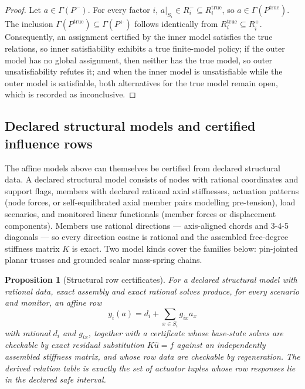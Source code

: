 \documentclass[11pt]{article}
\theoremstyle{plain}
\newtheorem{proposition}[theorem]{Proposition}
\theoremstyle{definition}
\theoremstyle{remark}
\begin{document}
\begin{proof}
Let \(a\in\Gamma(P^-)\).  For every factor \(i\),
\(a|_{S_i}\in R_i^-\subseteq R_i^{\mathrm{true}}\), so
\(a\in\Gamma(P^{\mathrm{true}})\).  The inclusion
\(\Gamma(P^{\mathrm{true}})\subseteq\Gamma(P^+)\) follows identically from
\(R_i^{\mathrm{true}}\subseteq R_i^+\).  Consequently, an assignment certified
by the inner model satisfies the true relations, so inner satisfiability
exhibits a true finite-model policy; if the outer model has no global
assignment, then neither has the true model, so outer unsatisfiability refutes
it; and when the inner model is unsatisfiable while the outer model is
satisfiable, both alternatives for the true model remain open, which is
recorded as inconclusive.
\end{proof}

\subsection{Declared structural models and certified influence rows}
\label{subsec:structural-front-end}

The affine models above can themselves be certified from declared structural
data.  A declared structural model consists of nodes with rational
coordinates and support flags, members with declared rational axial
stiffnesses, actuation patterns (node forces, or self-equilibrated axial
member pairs modelling pre-tension), load scenarios, and monitored linear
functionals (member forces or displacement components).  Members use rational
directions --- axis-aligned chords and 3-4-5 diagonals --- so every direction
cosine is rational and the assembled free-degree stiffness matrix \(K\) is
exact.  Two model kinds cover the families below: pin-jointed planar trusses
and grounded scalar mass-spring chains.

\begin{proposition}[Structural row certificates]
\label{prop:structural-row-certificates}
For a declared structural model with rational data, exact assembly and exact
rational solves produce, for every scenario and monitor, an affine row
\[
  y_i(a)=d_i+\sum_{x\in S_i}g_{ix}a_x
\]
with rational \(d_i\) and \(g_{ix}\), together with a certificate whose
base-state solves are checkable by exact residual substitution
\(K\widehat u=f\) against an independently assembled stiffness matrix, and
whose row data are checkable by regeneration.  The derived relation table is
exactly the set of actuator tuples whose row responses lie in the declared
safe interval.
\end{proposition}
\end{document}
